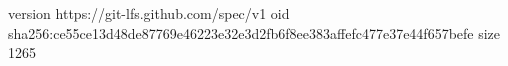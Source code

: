 version https://git-lfs.github.com/spec/v1
oid sha256:ce55ce13d48de87769e46223e32e3d2fb6f8ee383affefc477e37e44f657befe
size 1265
